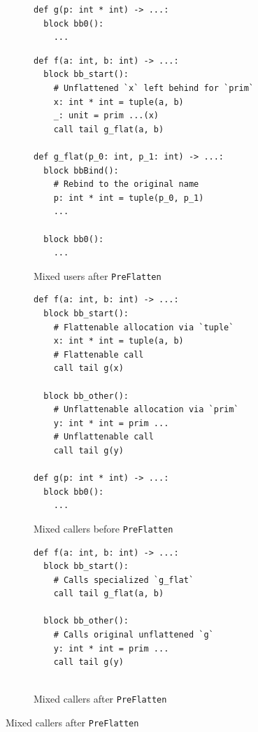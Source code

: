 \begin{figure}[htbp]
\begin{subfigure}[t]{0.48\textwidth}
\begin{verbatim}
def g(p: int * int) -> ...:
  block bb0():
    ...
\end{verbatim}
  \end{subfigure}\hfill
  \begin{subfigure}[t]{0.48\textwidth}
    \caption{Mixed users after \texttt{PreFlatten}}
    \label{fig:pre_flatten_mixed_users_after}
\begin{verbatim}
def f(a: int, b: int) -> ...:
  block bb_start():
    # Unflattened `x` left behind for `prim`
    x: int * int = tuple(a, b)
    _: unit = prim ...(x)
    call tail g_flat(a, b)

def g_flat(p_0: int, p_1: int) -> ...:
  block bbBind():
    # Rebind to the original name
    p: int * int = tuple(p_0, p_1)
    ...

  block bb0():
    ...
\end{verbatim}
  \end{subfigure}

  \vspace{1mm}

  \begin{subfigure}[t]{0.48\textwidth}
    \caption{Mixed callers before \texttt{PreFlatten}}
    \label{fig:pre_flatten_mixed_callers_before}
\begin{verbatim}
def f(a: int, b: int) -> ...:
  block bb_start():
    # Flattenable allocation via `tuple`
    x: int * int = tuple(a, b)
    # Flattenable call
    call tail g(x)

  block bb_other():
    # Unflattenable allocation via `prim`
    y: int * int = prim ...
    # Unflattenable call
    call tail g(y)

def g(p: int * int) -> ...:
  block bb0():
    ...
\end{verbatim}
  \end{subfigure}\hfill
  \begin{subfigure}[t]{0.48\textwidth}
    \caption{Mixed callers after \texttt{PreFlatten}}
    \label{fig:pre_flatten_mixed_callers_after}
\begin{verbatim}
def f(a: int, b: int) -> ...:
  block bb_start():
    # Calls specialized `g_flat`
    call tail g_flat(a, b)

  block bb_other():
    # Calls original unflattened `g`
    y: int * int = prim ...
    call tail g(y)


\end{verbatim}
\end{subfigure}
\end{figure}
